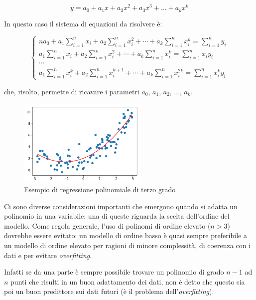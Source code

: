 $$y=a_{0}+a_{1} x+a_{2} x^{2}+a_{3} x^{3}+\ldots+a_{k} x^{k}$$\smallskip

In questo caso il sistema di equazioni da risolvere è:

$$\left\{\begin{array}{l}
n a_{0}+a_{1} \sum_{i=1}^{n} x_{i}+a_{2} \sum_{i=1}^{n} x_{i}^{2}+\cdots+a_{k} \sum_{i=1}^{n} x_{i}^{k}=\sum_{i=1}^{n} y_{i} \\
a_{1} \sum_{i=1}^{n} x_{i}+a_{2} \sum_{i=1}^{n} x_{i}^{2}+\cdots+a_{k} \sum_{i=1}^{n} x_{i}^{k}=\sum_{i=1}^{n} x_{i} y_{i} \\
\cdots \\
a_{1} \sum_{i=1}^{n} x_{i}^{k}+a_{2} \sum_{i=1}^{n} x_{i}^{k+1}+\cdots+a_{k} \sum_{i=1}^{n} x_{i}^{2 k}=\sum_{i=1}^{n} x_{i}^{k} y_{i}
\end{array}\right.$$\smallskip

che, risolto, permette di ricavare i parametri $a_0$, $a_1$, $a_2$, ..., $a_k$.

\begin{figure}[H]
\centering
\includegraphics[width=0.55\textwidth,height=\textheight,keepaspectratio]{img/poly_reg_example.png}
\caption{Esempio di regressione polinomiale di terzo grado}
\label{fig:poly_reg}
\end{figure}

Ci sono diverse considerazioni importanti che emergono quando si adatta un polinomio in una variabile: una di queste riguarda la scelta dell'ordine del modello.
Come regola generale, l'uso di polinomi di ordine elevato ($n > 3$) dovrebbe essere evitato: un modello di ordine basso è quasi sempre preferibile a un modello di ordine elevato per ragioni di minore complessità, di coerenza con i dati e per evitare \textit{overfitting}. \cite{introduction_to_lr}

Infatti se da una parte è sempre possibile trovare un polinomio di grado $n-1$ ad $n$ punti che risulti in un buon adattamento dei dati, non è detto che questo sia poi un buon predittore sui dati futuri (è il problema dell'\textit{overfitting}).

